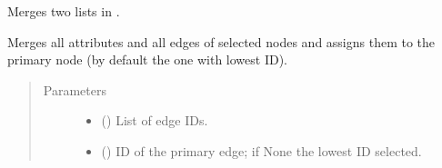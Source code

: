 \documentclass[letterpaper,10pt,english]{sphinxmanual}
\begin{document}
\begin{fulllineitems}
\begin{fulllineitems}
\begin{quote}
\begin{description}
\end{description}\end{quote}

\end{fulllineitems}


\begin{fulllineitems}
\label{\detokenize{main:pypath.main.PyPath.merge_lists}}
Merges two lists in .

\end{fulllineitems}


\begin{fulllineitems}
\label{\detokenize{main:pypath.main.PyPath.merge_nodes}}
Merges all attributes and all edges of selected nodes
and assigns them to the primary node
(by default the one with lowest ID).
\begin{quote}\begin{description}
\item[{Parameters}] \leavevmode\begin{itemize}
\item {} 
 () \textendash{} List of edge IDs.

\item {} 
 () \textendash{} ID of the primary edge;
if None the lowest ID selected.

\end{itemize}

\end{description}\end{quote}

\end{fulllineitems}


\begin{fulllineitems}
\label{\detokenize{main:pypath.main.PyPath.mimp_directions}}
\end{fulllineitems}


\end{fulllineitems}
\end{document}
